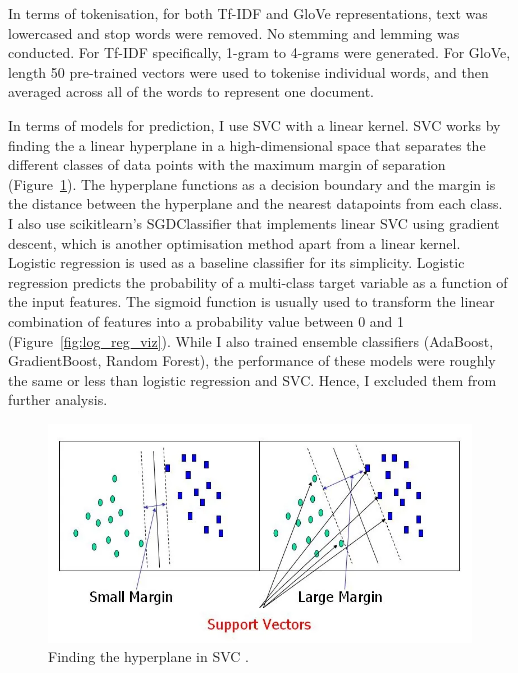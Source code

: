 In terms of tokenisation, for both Tf-IDF and GloVe representations, text was lowercased and stop words were removed. No stemming and lemming was conducted. For Tf-IDF specifically, 1-gram to 4-grams were generated. For GloVe, length 50 pre-trained vectors were used to tokenise individual words, and then averaged across all of the words to represent one document.

In terms of models for prediction, I use SVC with a linear kernel. SVC works by finding the a linear hyperplane in a high-dimensional space that separates the different classes of data points with the maximum margin of separation (Figure~\ref{fig:svc_viz}). The hyperplane functions as a decision boundary and the margin is the distance between the hyperplane and the nearest datapoints from each class. I also use scikitlearn's SGDClassifier that implements linear SVC using gradient descent, which is another optimisation method apart from a linear kernel. Logistic regression is used as a baseline classifier for its simplicity. Logistic regression predicts the probability of a multi-class target variable as a function of the input features. The sigmoid function is usually used to transform the linear combination of features into a probability value between 0 and 1 (Figure~\ref{fig:log_reg_viz}). While I also trained ensemble classifiers (AdaBoost, GradientBoost, Random Forest), the performance of these models were roughly the same or less than logistic regression and SVC. Hence, I excluded them from further analysis.

\begin{figure}[!ht]
	\centering
	\includegraphics[width=1\linewidth]{figures/svc_viz.png}
	\caption{Finding the hyperplane in SVC \cite{svc_viz}.}   
    \label{fig:svc_viz}
\end{figure}

